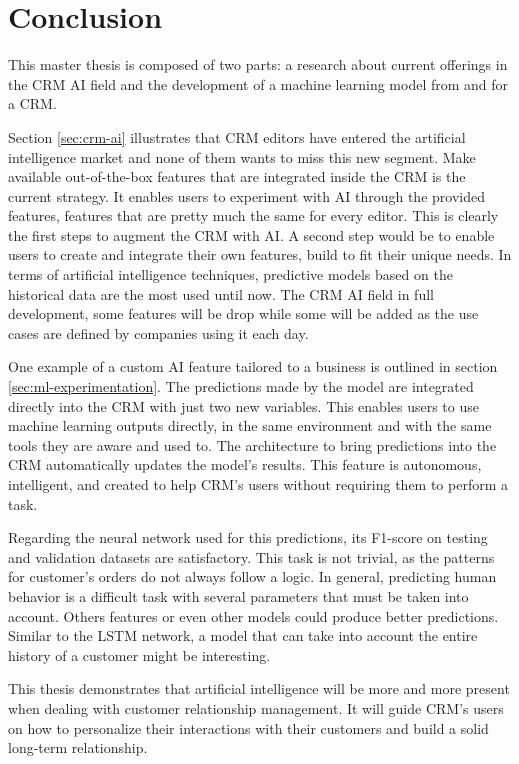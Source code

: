 \chapter{Conclusion}

\vspace{-1cm}

This master thesis is composed of two parts: a research about current offerings in the CRM AI field and the development of a machine learning model from and for a CRM.

Section \ref{sec:crm-ai} illustrates that CRM editors have entered the artificial intelligence market and none of them wants to miss this new segment. Make available out-of-the-box features that are integrated inside the CRM is the current strategy. It enables users to experiment with AI through the provided features, features that are pretty much the same for every editor. This is clearly the first steps to augment the CRM with AI. A second step would be to enable users to create and integrate their own features, build to fit their unique needs. In terms of artificial intelligence techniques, predictive models based on the historical data are the most used until now. The CRM AI field in full development, some features will be drop while some will be added as the use cases are defined by companies using it each day.

One example of a custom AI feature tailored to a business is outlined in section \ref{sec:ml-experimentation}. The predictions made by the model are integrated directly into the CRM with just two new variables. This enables users to use machine learning outputs directly, in the same environment and with the same tools they are aware and used to. The architecture to bring predictions into the CRM automatically updates the model's results. This feature is autonomous, intelligent, and created to help CRM's users without requiring them to perform a task.

Regarding the neural network used for this predictions, its F1-score on testing and validation datasets are satisfactory. This task is not trivial, as the patterns for customer's orders do not always follow a logic. In general, predicting human behavior is a difficult task with several parameters that must be taken into account. Others features or even other models could produce better predictions. Similar to the LSTM network, a model that can take into account the entire history of a customer might be interesting.

This thesis demonstrates that artificial intelligence will be more and more present when dealing with customer relationship management. It will guide CRM's users on how to personalize their interactions with their customers and build a solid long-term relationship.